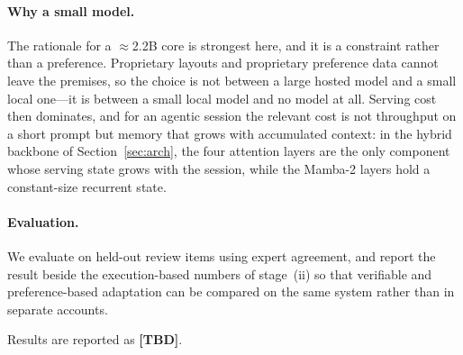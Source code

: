 \paragraph{Why a small model.}
The rationale for a $\approx$2.2B core is strongest here, and it is a constraint rather than a preference.
Proprietary layouts and proprietary preference data cannot leave the premises, so the choice is not between a large hosted model and a small local one---it is between a small local model and no model at all.
Serving cost then dominates, and for an agentic session the relevant cost is not throughput on a short prompt but memory that grows with accumulated context: in the hybrid backbone of Section~\ref{sec:arch}, the four attention layers are the only component whose serving state grows with the session, while the Mamba-2 layers hold a constant-size recurrent state.

\paragraph{Evaluation.}
We evaluate on held-out review items using expert agreement, and report the result beside the execution-based numbers of stage~(ii) so that verifiable and preference-based adaptation can be compared on the same system rather than in separate accounts.

Results are reported as \textbf{[TBD]}.
